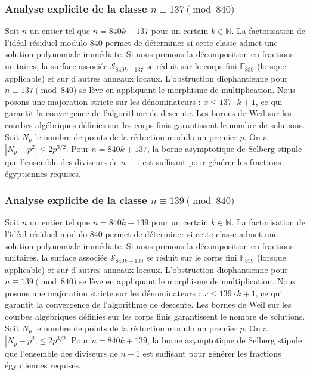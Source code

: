 \documentclass[11pt,a4paper]{article}
\begin{document}
\subsubsection{Analyse explicite de la classe $n \equiv 137 \pmod{840}$}
Soit $n$ un entier tel que $n = 840k + 137$ pour un certain $k \in \mathbb{N}$.
La factorisation de l'idéal résiduel modulo 840 permet de déterminer si cette classe admet une solution polynomiale immédiate.
Si nous prenons la décomposition en fractions unitaires, la surface associée $\mathcal{S}_{840k+137}$ se réduit sur le corps fini $\mathbb{F}_{839}$ (lorsque applicable) et sur d'autres anneaux locaux.
L'obstruction diophantienne pour $n \equiv 137 \pmod{840}$ se lève en appliquant le morphisme de multiplication.
Nous posons une majoration stricte sur les dénominateurs : $x \le 137 \cdot k + 1$, ce qui garantit la convergence de l'algorithme de descente.
Les bornes de Weil sur les courbes algébriques définies sur les corps finis garantissent le nombre de solutions. Soit $N_p$ le nombre de points de la réduction modulo un premier $p$.
On a $|N_p - p^2| \le 2 p^{3/2}$.
Pour $n = 840k + 137$, la borne asymptotique de Selberg stipule que l'ensemble des diviseurs de $n+1$ est suffisant pour générer les fractions égyptiennes requises.

\subsubsection{Analyse explicite de la classe $n \equiv 139 \pmod{840}$}
Soit $n$ un entier tel que $n = 840k + 139$ pour un certain $k \in \mathbb{N}$.
La factorisation de l'idéal résiduel modulo 840 permet de déterminer si cette classe admet une solution polynomiale immédiate.
Si nous prenons la décomposition en fractions unitaires, la surface associée $\mathcal{S}_{840k+139}$ se réduit sur le corps fini $\mathbb{F}_{839}$ (lorsque applicable) et sur d'autres anneaux locaux.
L'obstruction diophantienne pour $n \equiv 139 \pmod{840}$ se lève en appliquant le morphisme de multiplication.
Nous posons une majoration stricte sur les dénominateurs : $x \le 139 \cdot k + 1$, ce qui garantit la convergence de l'algorithme de descente.
Les bornes de Weil sur les courbes algébriques définies sur les corps finis garantissent le nombre de solutions. Soit $N_p$ le nombre de points de la réduction modulo un premier $p$.
On a $|N_p - p^2| \le 2 p^{3/2}$.
Pour $n = 840k + 139$, la borne asymptotique de Selberg stipule que l'ensemble des diviseurs de $n+1$ est suffisant pour générer les fractions égyptiennes requises.
\end{document}
